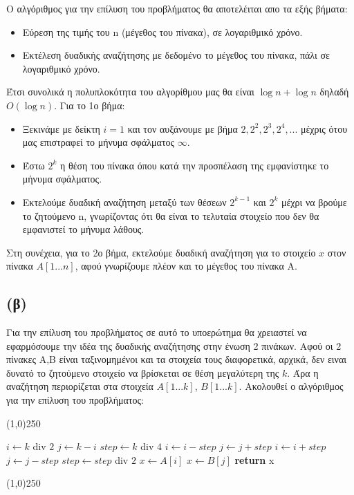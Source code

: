 \documentclass[a4paper,12pt]{report}
\begin{document}
Ο αλγόριθμος για την επίλυση του προβλήματος θα αποτελέιται απο τα εξής βήματα:
\begin{itemize}
 \item Εύρεση της τιμής του n (μέγεθος του πίνακα), σε λογαριθμικό χρόνο.
 \item Εκτέλεση δυαδικής αναζήτησης με δεδομένο το μέγεθος του πίνακα, πάλι σε λογαριθμικό χρόνο.
\end{itemize} 

Έτσι συνολικά η πολυπλοκότητα του αλγορίθμου μας θα είναι $\log n + \log n$ δηλαδή $O(\log n)$. Για το 1ο βήμα:
\begin{itemize}
 \item Ξεκινάμε με δείκτη $i=1$ και τον αυξάνουμε με βήμα $2,2^2,2^3,2^4,...$ μέχρις ότου μας επιστραφεί το μήνυμα σφάλματος $\infty$.
 \item Έστω $2^k$ η θέση του πίνακα όπου κατά την προσπέλαση της εμφανίστηκε το μήνυμα σφάλματος.
 \item Εκτελούμε δυαδική αναζήτηση μεταξύ των θέσεων $2^{k-1}$ και $2^{k}$ μέχρι να βρούμε το ζητούμενο n, γνωρίζοντας ότι θα είναι το τελυταία στοιχείο που δεν θα εμφανιστεί το μήνυμα λάθους.
\end{itemize}

Στη συνέχεια, για το 2ο βήμα, εκτελούμε δυαδική αναζήτηση για το στοιχείο $x$ στον πίνακα $A[1...n]$, αφού γνωρίζουμε πλέον και το μέγεθος του πίνακα Α.

\subsection*{(β)}
Για την επίλυση του προβλήματος σε αυτό το υποερώτημα θα χρειαστεί να εφαρμόσουμε την ιδέα της δυαδικής αναζήτησης στην ένωση 2 πινάκων. 
Αφού οι 2 πίνακες Α,Β είναι ταξινομημένοι και τα στοιχεία τους διαφορετικά, αρχικά, δεν ειναι δυνατό το ζητούμενο στοιχείο να βρίσκεται σε θέση μεγαλύτερη
της $k$. Άρα η αναζήτηση περιορίζεται στα στοιχεία $A[1...k]$, $B[1...k]$. Ακολουθεί ο αλγόριθμος για την επίλυση του προβλήματος: 

\begin{center}
\line(1,0){250} 
\begin{algorithmic}[1]
  \State $i \gets k$ div $2$
  \State $j \gets k-i$
  \State $step \gets k$ div $4$
      \State $i \gets i-step$
      \State $j \gets j+step$
    \Else
      \State $i \gets i+step$
      \State $j \gets j-step$
    \EndIf
    \State $step \gets step$ div $2$
  \EndWhile
    \State $x \gets A[i]$
  \Else
    \State $x \gets B[j]$
  \EndIf
  \State \textbf{return} x 
\EndProcedure
\end{algorithmic}
\line(1,0){250} 
\end{center}
\end{document}
